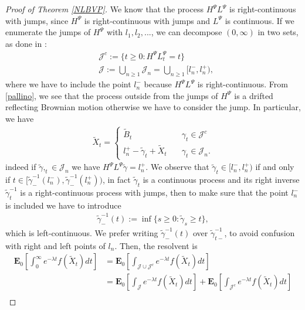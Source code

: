\documentclass[11pt,a4paper]{article}
\theoremstyle{definition}
\theoremstyle{remark}
\begin{document}
\begin{proof}[Proof of Theorem \ref{NLBVP}]
	
	We know that the process $H^\Psi L^\Psi$  is right-continuous with jumps, since $H^\Psi$ is right-continuous with jumps and $L^\Psi$ is continuous. If we enumerate the jumps of $H^\Psi$ with $l_1, l_2,...$, we can decompose $(0,\infty)$ in two sets, as done in \cite[Lemma 3.5]{Pilipenko}:
	\begin{align*}
		&\mathcal{J}^c:=\{t \geq 0 : H^\Psi L^\Psi_t = t\}\\
		&\mathcal{J} := \bigcup_{n \geq 1} \mathcal{J}_n= \bigcup_{n \geq 1} [l_n^{-}, l_n^+),
	\end{align*}
	where we have to include the point $l_n^-$ because $H^\Psi L^\Psi$ is right-continuous. From \eqref{pallino}, we see that the process outside from the jumps of $H^\Psi$ is a drifted reflecting Brownian motion otherwise we have to consider the jump. In particular, we have
	\begin{align*}
		\widetilde{X}_t=
		\begin{cases}
			\widetilde{B}_t \quad & \gamma_t \in \mathcal{J}^c\\
			l_n^+-\widetilde{\gamma}_t + \widetilde{X}_t \quad & \gamma_t \in \mathcal{J}_n.
		\end{cases}
	\end{align*}
	indeed if $\widetilde{\gamma},_t \in \mathcal{J}_n$ we have $H^\Psi L^\Psi \widetilde{\gamma}= l_n^+$. We observe that $\widetilde{\gamma}_t \in [l_n^-,l_n^+)$ if and only if $t \in [\widetilde{\gamma}_{-}^{-1}(l_n^-), \widetilde{\gamma}_{-}^{-1}(l_n^+))$, in fact $\widetilde{\gamma}_t$ is a continuous process and its right inverse $\widetilde{\gamma}_t^{-1}$ is a right-continuous process with jumps, then to make sure that the point $l_n^-$ is included we have to introduce
	\begin{align*}
		\widetilde{\gamma}_{-}^{-1}(t):=\inf \{s \geq 0 : \widetilde{\gamma}_s \geq t\},
	\end{align*}  
	which is left-continuous. We prefer writing $\widetilde{\gamma}_{-}^{-1}(t)$ over $\widetilde{\gamma}_{t-}^{-1}$, to avoid confusion with right and left points of $l_n$.  Then, the resolvent is
	\begin{align*}
		\mathbf{E}_{0}  \left[\int_0^\infty e^{-\lambda t} f (\widetilde{X}_t) dt\right]&= \mathbf{E}_{0}  \left[\int_{\mathcal{J}\cup \mathcal{J}^c} e^{-\lambda t} f(\widetilde{X}_t) dt\right]
		\\
		&=\mathbf{E}_{0}  \left[\int_{\mathcal{J}} e^{-\lambda t} f(\widetilde{X}_t) dt\right] + \mathbf{E}_{0}  \left[\int_{\mathcal{J}^c} e^{-\lambda t} f(\widetilde{X}_t) dt\right]\\

\end{align*}
\end{proof}
\end{document}
